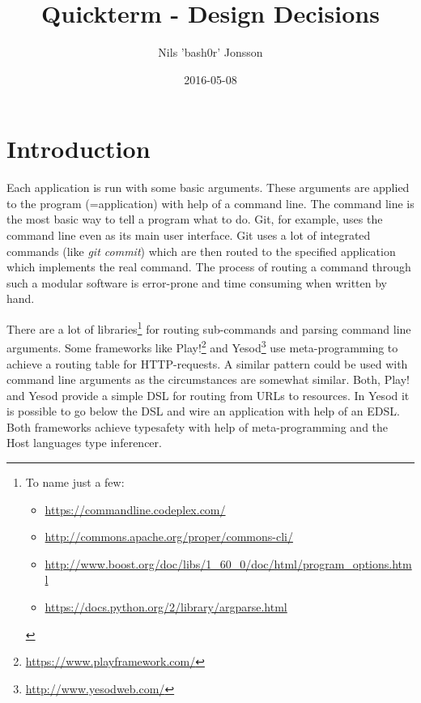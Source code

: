 \documentclass[a4paper]{article}
\title{Quickterm - Design Decisions}
\author{Nils 'bash0r' Jonsson}
\date{2016-05-08}
\begin{document}
\maketitle

\begin{abstract}

\end{abstract}

\section{Introduction}
Each application is run with some basic arguments. These arguments are applied to the program (=application) with help of a command line. The command line is the most basic way to tell a program what to do. Git, for example, uses the command line even as its main user interface. Git uses a lot of integrated commands (like \textit{git commit}) which are then routed to the specified application which implements the real command. The process of routing a command through such a modular software is error-prone and time consuming when written by hand.

There are a lot of libraries\footnote{To name just a few: \begin{itemize}\item\url{https://commandline.codeplex.com/} \item\url{http://commons.apache.org/proper/commons-cli/} \item\url{http://www.boost.org/doc/libs/1_60_0/doc/html/program_options.html} \item\url{https://docs.python.org/2/library/argparse.html}\end{itemize}} for routing sub-commands and parsing command line arguments. Some frameworks like Play!\footnote{\url{https://www.playframework.com/}} and Yesod\footnote{\url{http://www.yesodweb.com/}} use meta-programming to achieve a routing table for HTTP-requests. A similar pattern could be used with command line arguments as the circumstances are somewhat similar. Both, Play! and Yesod provide a simple DSL for routing from URLs to resources. In Yesod it is possible to go below the DSL and wire an application with help of an EDSL. Both frameworks achieve typesafety with help of meta-programming and the Host languages type inferencer.
\end{document}
